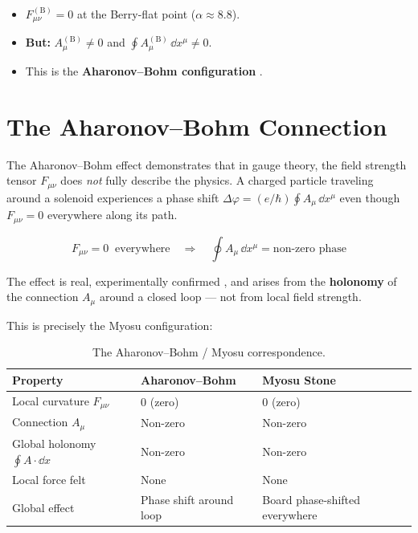 \documentclass[12pt,a4paper]{article}
\begin{document}
\begin{itemize}[nosep]
    \item $F_{\mu\nu}^{(\mathrm{B})} = 0$ at the Berry-flat point ($\alpha \approx 8.8$).
    \item \textbf{But:} $A_\mu^{(\mathrm{B})} \neq 0$ and $\oint A_\mu^{(\mathrm{B})}\,\dd x^\mu \neq 0$.
    \item This is the \textbf{Aharonov–Bohm configuration} \cite{aharonov1959,peshkin1989}.
\end{itemize}

\section{The Aharonov–Bohm Connection}

The Aharonov–Bohm effect \cite{aharonov1959,peshkin1989,tonomura1986} demonstrates that in gauge theory, the field strength tensor $F_{\mu\nu}$ does \emph{not} fully describe the physics. A charged particle traveling around a solenoid experiences a phase shift $\Delta\varphi = (e/\hbar)\oint A_\mu\,\dd x^\mu$ even though $F_{\mu\nu} = 0$ everywhere along its path.

\begin{equation}
F_{\mu\nu} = 0 \;\; \text{everywhere} \quad\Longrightarrow\quad \oint A_\mu\,\dd x^\mu = \text{non-zero phase}
\label{eq:ab}
\end{equation}

The effect is real, experimentally confirmed \cite{tonomura1986}, and arises from the \textbf{holonomy} of the connection $A_\mu$ around a closed loop — not from local field strength.

This is precisely the Myosu configuration:

\begin{table}[h]
\centering
\begin{tabular}{@{}p{4cm}p{4.5cm}p{4.5cm}@{}}
\toprule
\textbf{Property} & \textbf{Aharonov–Bohm} & \textbf{Myosu Stone} \\
\midrule
Local curvature $F_{\mu\nu}$ & 0 (zero) & 0 (zero) \\
Connection $A_\mu$ & Non-zero & Non-zero \\
Global holonomy $\oint A\!\cdot\!\dd x$ & Non-zero & Non-zero \\
Local force felt & None & None \\
Global effect & Phase shift around loop & Board phase-shifted everywhere \\
\bottomrule
\end{tabular}
\caption{The Aharonov–Bohm / Myosu correspondence.}
\label{tab:ab}
\end{table}
\end{document}
